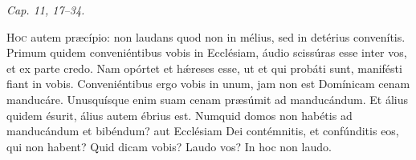 
{\hfill \textit{Cap. 11, 17–34.}}

\lettrine{H}{oc} autem præcípio: non laudans quod non in mélius, sed in detérius convenítis.
Primum quidem conveniéntibus vobis in Ecclésiam, áudio scissúras esse inter vos, et ex parte credo.
Nam opórtet et hǽreses esse, ut et qui probáti sunt, manifésti fiant in vobis.
Conveniéntibus ergo vobis in unum, jam non est Domínicam cenam manducáre.
Unus\-quísque enim suam cenam præsúmit ad manducándum. Et álius quidem ésurit, álius autem ébrius est.
Numquid domos non habétis ad manducándum et bibéndum? aut Ecclésiam Dei contémnitis, et confúnditis eos, qui non habent? Quid dicam vobis? Laudo vos? In hoc non laudo.